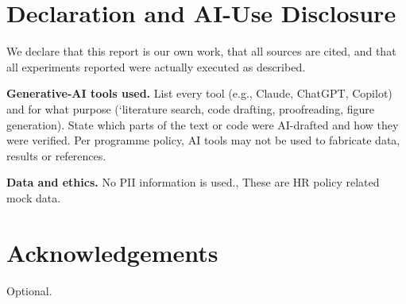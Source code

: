 \documentclass[11pt,letterpaper,oneside]{report}
\begin{document}
\chapter*{Declaration and AI-Use Disclosure}
We declare that this report is our own work, that all sources are cited, and
that all experiments reported were actually executed as described.

\medskip
\noindent\textbf{Generative-AI tools used.} List every tool (e.g., Claude, ChatGPT,
Copilot) and for what purpose (`literature search, code drafting, proofreading,
figure generation). State which parts of the text or code were AI-drafted and
how they were verified. Per programme policy, AI tools may not be used to
fabricate data, results or references.

\medskip
\noindent\textbf{Data and ethics.} No PII information is used., These are HR policy related mock data.

\chapter*{Acknowledgements}
Optional.

\tableofcontents
\listoffigures
\listoftables
\end{document}
